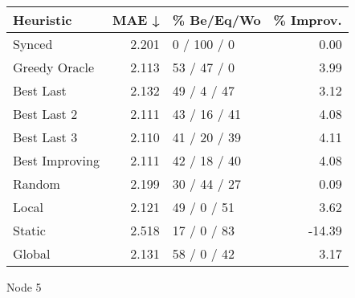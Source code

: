 \begin{tabular}{lrlr}
\toprule
\textbf{Heuristic} & \textbf{MAE ↓} & \textbf{\% Be/Eq/Wo} & \textbf{\% Improv.} \\
\midrule
            Synced &          2.201 &          0 / 100 / 0 &                0.00 \\
     Greedy Oracle &          2.113 &          53 / 47 / 0 &                3.99 \\
         Best Last &          2.132 &          49 / 4 / 47 &                3.12 \\
       Best Last 2 &          2.111 &         43 / 16 / 41 &                4.08 \\
       Best Last 3 &          2.110 &         41 / 20 / 39 &                4.11 \\
    Best Improving &          2.111 &         42 / 18 / 40 &                4.08 \\
            Random &          2.199 &         30 / 44 / 27 &                0.09 \\
             Local &          2.121 &          49 / 0 / 51 &                3.62 \\
            Static &          2.518 &          17 / 0 / 83 &              -14.39 \\
            Global &          2.131 &          58 / 0 / 42 &                3.17 \\
\bottomrule
\end{tabular}
\caption{Node 5}
\label{tab:hr_non_lr01_le1_bs4_5}
